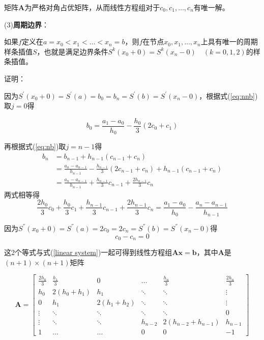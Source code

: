 \documentclass[12pt]{ctexart}
\begin{document}
	矩阵$\mathbf{A}$为严格对角占优矩阵，从而线性方程组对于$c_0,c_1,\dots,c_n$有唯一解。
	
	(3)\textbf{周期边界}：
	
	如果$f$定义在$a=x_0<x_1<\dots<x_n=b$，则$f$在节点$x_0,x_1,\dots,x_n$上具有唯一的周期样条插值$S$，也就是满足边界条件$S^{k}(x_0+0)=S^{k}(x_n-0)\quad (k=0,1,2)$的样条插值。
	
	证明：
	
	因为$S^{'}(x_0+0)=S^{'}(a)=b_0=b_n=S^{'}(b)=S^{'}(x_n-0)$，根据式(\ref{eq:nnb})取$j=0$得
	
	\begin{equation*}
	b_0=\frac{a_1-a_0}{h_0}-\frac{h_0}{3}(2c_0+c_1)
	\end{equation*}
	
	再根据式(\ref{eq:nb})取$j=n-1$得
	\begin{equation*}
	\begin{split}
	b_n&=b_{n-1}+h_{n-1}(c_{n-1}+c_n) \\
	&=\frac{a_n-a_{n-1}}{h_{n-1}}-\frac{h_{n-1}}{3}(2c_{n-1}+c_n)+h_{n-1}(c_{n-1}+c_n) \\
	&=\frac{a_n-a_{n-1}}{h_{n-1}}+\frac{h_{n-1}}{3}c_{n-1}+\frac{2h_{n-1}}{3}c_n
	\end{split}
	\end{equation*}
	两式相等得
	\begin{equation*}
	\frac{2h_0}{3}c_0+\frac{h_0}{3}c_1+\frac{h_{n-1}}{3}c_{n-1}+\frac{2h_{n-1}}{3}c_n=\frac{a_1-a_0}{h_0}-\frac{a_n-a_{n-1}}{h_{n-1}}
	\end{equation*}
	
	因为$S^{''}(x_0+0)=S^{''}(a)=2c_0=2c_n=S^{''}(b)=S^{''}(x_n-0)$得
	\begin{equation*}
	c_0-c_n=0
	\end{equation*}
	
	这2个等式与式(\ref{linear system})一起可得到线性方程组$\mathbf{Ax}=\mathbf{b}$，其中$\mathbf{A}$是$(n+1)\times(n+1)$矩阵
	
	\[
	\mathbf{A}=\begin{bmatrix}
	\frac{2h_0}{3}&\frac{h_1}{3}&0&\dots&\frac{h_n}{3}&\frac{2h_n}{3} \\
	h_0&2(h_0+h_1)&h_1&\ddots&\ddots&\vdots \\
	0&h_1&2(h_1+h_2)&\ddots&\ddots&\vdots \\
	\vdots&\ddots&\ddots&\ddots&\ddots&0 \\
	\vdots&\ddots&\ddots&h_{n-2}&2(h_{n-2}+h_{n-1})&h_{n-1} \\
	1&\dots&\dots&0&0&-1
	\end{bmatrix}
	\]
	
\end{document}

